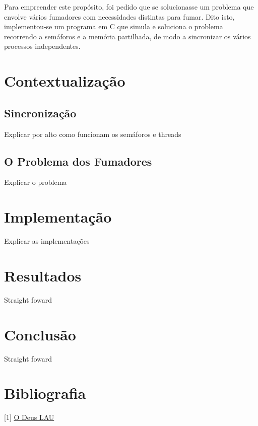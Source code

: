 \documentclass[10pt,portuguese]{article}
\begin{document}
\par Para empreender este propósito, foi pedido que se solucionasse um problema que envolve vários fumadores com necessidades distintas para fumar. Dito isto, implementou-se um programa em C que simula e soluciona o problema recorrendo a semáforos e a memória partilhada, de modo a sincronizar os vários processos independentes.

\clearpage

\section{Contextualização}

\subsection{Sincronização}

Explicar por alto como funcionam os semáforos e threads

\clearpage

\subsection{O Problema dos Fumadores}

Explicar o problema

\clearpage

\section{Implementação}

Explicar as implementações

\clearpage

\section{Resultados}

Straight foward

\clearpage

\section{Conclusão}

Straight foward

\clearpage

\section{Bibliografia}





\vspace{5mm} %

[1] \url{O Deus LAU}
\end{document}
